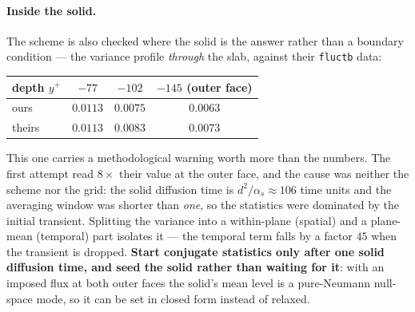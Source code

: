 \documentclass[11pt,a4paper]{article}
\newcommand{\code}[1]{\texttt{#1}}
\begin{document}
\paragraph{Inside the solid.}
The scheme is also checked where the solid is the answer rather than a boundary
condition --- the variance profile \emph{through} the slab, against their
\code{fluctb} data:
\begin{center}
\begin{tabular}{lccc}
\toprule
depth $y^+$ & $-77$ & $-102$ & $-145$ (outer face) \\
\midrule
ours    & $0.0113$ & $0.0075$ & $0.0063$ \\
theirs  & $0.0113$ & $0.0083$ & $0.0073$ \\
\bottomrule
\end{tabular}
\end{center}
This one carries a methodological warning worth more than the numbers. The
first attempt read $8\times$ their value at the outer face, and the cause was
neither the scheme nor the grid: the solid diffusion time is
$d^2/\alpha_s \approx 106$ time units and the averaging window was shorter than
\emph{one}, so the statistics were dominated by the initial transient.
Splitting the variance into a within-plane (spatial) and a plane-mean
(temporal) part isolates it --- the temporal term falls by a factor $45$ when
the transient is dropped. \textbf{Start conjugate statistics only after one
solid diffusion time, and seed the solid rather than waiting for it}: with an
imposed flux at both outer faces the solid's mean level is a pure-Neumann
null-space mode, so it can be set in closed form instead of relaxed.
\end{document}
